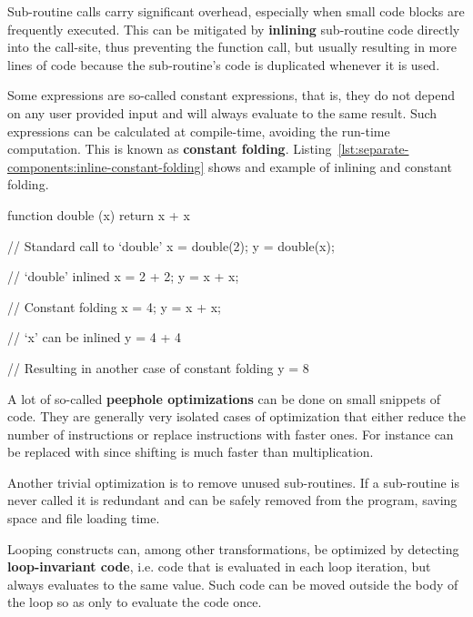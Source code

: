 Sub-routine calls carry significant overhead, especially when small code blocks
are frequently executed. This can be mitigated by \textbf{inlining} sub-routine
code directly into the call-site, thus preventing the function call, but usually
resulting in more lines of code because the sub-routine's code is duplicated
whenever it is used.

Some expressions are so-called constant expressions, that is, they do not depend
on any user provided input and will always evaluate to the same result. Such
expressions can be calculated at compile-time, avoiding the run-time
computation. This is known as \textbf{constant
  folding}. Listing~\ref{lst:separate-components:inline-constant-folding} shows
and example of inlining and constant folding.

\begin{ccode}[
  caption={Sub-routine inlining and constant folding},
  label={lst:separate-components:inline-constant-folding}]
function double (x) { return x + x }

// Standard call to `double'
x = double(2);
y = double(x);

// `double' inlined
x = 2 + 2;
y = x + x;

// Constant folding
x = 4;
y = x + x;

// `x' can be inlined
y = 4 + 4

// Resulting in another case of constant folding
y = 8
\end{ccode}

A lot of so-called \textbf{peephole optimizations} can be done on small snippets
of code. They are generally very isolated cases of optimization that either
reduce the number of instructions or replace instructions with faster ones. For
instance  can be replaced with  since shifting is
much faster than multiplication.

Another trivial optimization is to remove unused sub-routines. If a sub-routine
is never called it is redundant and can be safely removed from the program,
saving space and file loading time.

Looping constructs can, among other transformations, be optimized by detecting
\textbf{loop-invariant code}, i.e. code that is evaluated in each loop
iteration, but always evaluates to the same value. Such code can be moved
outside the body of the loop so as only to evaluate the code once.



